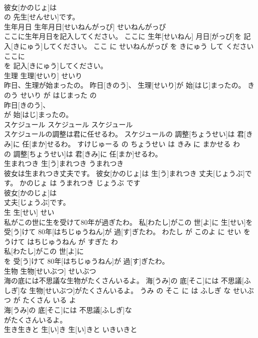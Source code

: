 \documentclass[8pt]{extreport}
\begin{document}
\begin{CJK}{UTF8}{min}
\\	彼女[かのじょ]は
\\	の 先生[せんせい]です。			
\\	生年月日	生年月日[せいねんがっぴ]	せいねんがっぴ	
\\	ここに生年月日を記入してください。	ここに 生年[せいねん] 月日[がっぴ]を 記入[きにゅう]してください。	ここ に せいねんがっぴ を きにゅう して ください	
\\	ここに
\\	を 記入[きにゅう]してください。			
\\	生理	生理[せいり]	せいり	
\\	昨日、生理が始まったの。	昨日[きのう]、 生理[せいり]が 始[はじ]まったの。	きのう せいり が はじまった の	
\\	昨日[きのう]、
\\	が 始[はじ]まったの。			
\\	スケジュール	スケジュール	スケジュール	
\\	スケジュールの調整は君に任せるわ。	スケジュールの 調整[ちょうせい]は 君[きみ]に 任[まか]せるわ。	すけじゅーる の ちょうせい は きみ に まかせる わ	
\\	の 調整[ちょうせい]は 君[きみ]に 任[まか]せるわ。			
\\	生まれつき	生[う]まれつき	うまれつき	
\\	彼女は生まれつき丈夫です。	彼女[かのじょ]は 生[う]まれつき 丈夫[じょうぶ]です。	かのじょ は うまれつき じょうぶ です	
\\	彼女[かのじょ]は
\\	丈夫[じょうぶ]です。			
\\	生	生[せい]	せい	
\\	私がこの世に生を受けて80年が過ぎたわ。	私[わたし]がこの 世[よ]に 生[せい]を 受[う]けて 80年[はちじゅうねん]が 過[す]ぎたわ。	わたし が このよ に せい を うけて はちじゅうねん が すぎた わ	
\\	私[わたし]がこの 世[よ]に
\\	を 受[う]けて 80年[はちじゅうねん]が 過[す]ぎたわ。			
\\	生物	生物[せいぶつ]	せいぶつ	
\\	海の底には不思議な生物がたくさんいるよ。	海[うみ]の 底[そこ]には 不思議[ふしぎ]な 生物[せいぶつ]がたくさんいるよ。	うみ の そこ に は ふしぎ な せいぶつ が たくさん いる よ	
\\	海[うみ]の 底[そこ]には 不思議[ふしぎ]な
\\	がたくさんいるよ。			
\\	生き生きと	生[い]き 生[い]きと	いきいきと	

\end{CJK}
\end{document}
